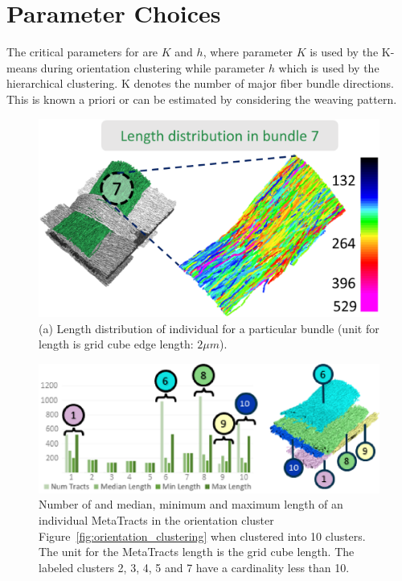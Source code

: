 \section{Parameter Choices}\label{sec:param_choices}
The critical parameters for \mt are $K$ and $h$, where parameter $K$ is used by the K-means during orientation clustering while parameter $h$ which is used by the hierarchical clustering.
K denotes the number of major fiber bundle directions. This is known a priori or can be estimated by considering the weaving pattern. 
\begin{figure}[tb]
	\centering
	\includegraphics[width=0.8\linewidth]{images/lengthDistribution.eps}
	\caption{(a) Length distribution of individual \mt for a particular bundle (unit for length is grid cube edge length:  $2\mu m$).}
	\label{fig:length_distribution}
\end{figure}
\begin{figure}[tb]
	\centering
	\includegraphics[width=\linewidth,  trim = 0mm 0mm 0mm 00mm, clip]{images/figure9_AMA.eps}
	\caption{Number of \mt and median, minimum and maximum length of an individual MetaTracts in the orientation cluster Figure~\ref{fig:orientation_clustering} when clustered into 10 clusters. The unit for the MetaTracts length is the grid cube length. The labeled clusters 2, 3, 4, 5 and 7 have a cardinality less than 10. }
	\label{fig:len_dist_crop16} 
\end{figure}

